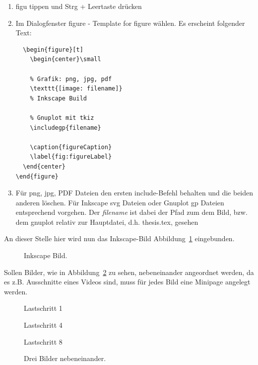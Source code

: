 \begin{enumerate}
  \item figu tippen und Strg + Leertaste drücken
  \item Im Dialogfenster figure - Template for figure wählen. Es erscheint
  folgender Text:
\begin{verbatim}
  \begin{figure}[t]
    \begin{center}\small

    % Grafik: png, jpg, pdf
    \texttt{[image: filename]}
    % Inkscape Build
    
    % Gnuplot mit tkiz
    \includegp{filename}

    \caption{figureCaption}
    \label{fig:figureLabel}
  \end{center}
\end{figure}
  \end{verbatim}
  \item Für png, jpg, PDF Dateien den ersten include-Befehl behalten und die
  beiden anderen löschen.
  Für Inkscape svg Dateien oder Gnuplot gp Dateien entsprechend vorgehen.
  Der \textit{filename} ist dabei der Pfad zum dem Bild, bzw. dem gnuplot
  relativ zur Hauptdatei, d.h. thesis.tex, gesehen
\end{enumerate}
An dieser Stelle hier wird nun das Inkscape-Bild Abbildung~\ref{fig:poly} eingebunden.
\begin{figure}[t]
  \centering\small
    
  \caption{Inkscape Bild.}
  \label{fig:poly}
\end{figure}
Sollen Bilder, wie in Abbildung~\ref{fig:drei_bilder} zu sehen, nebeneinander
angeordnet werden, da es z.B.
Ausschnitte eines Videos sind, muss für jedes Bild eine Minipage angelegt werden.
\begin{figure}[b]
\begin{minipage}[t]{4cm}
\centering
    
    \scriptsize{Lastschritt 1}
\end{minipage}
\hfill
\begin{minipage}[t]{4cm}
\centering
    
    \scriptsize{Lastschritt 4}
\end{minipage}
\hfill
\begin{minipage}[t]{4cm}
\centering
    
    \scriptsize{Lastschritt 8}
\end{minipage}
\caption{Drei Bilder nebeneinander.}
\label{fig:drei_bilder}
\end{figure}
